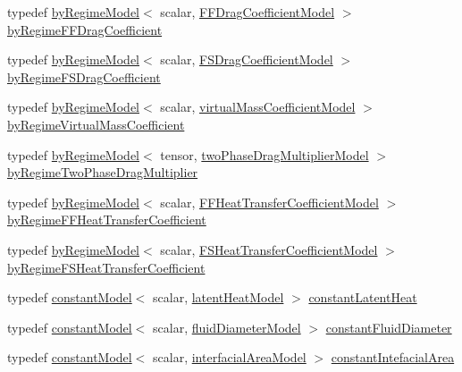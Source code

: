 \begin{DoxyCompactItemize}
\item 
typedef \hyperlink{classFoam_1_1byRegimeModel}{by\+Regime\+Model}$<$ scalar, \hyperlink{classFoam_1_1FFDragCoefficientModel}{F\+F\+Drag\+Coefficient\+Model} $>$ \hyperlink{namespaceFoam_af81bf1c46b48683cfa1a97758c9a88ee}{by\+Regime\+F\+F\+Drag\+Coefficient}
\item 
typedef \hyperlink{classFoam_1_1byRegimeModel}{by\+Regime\+Model}$<$ scalar, \hyperlink{classFoam_1_1FSDragCoefficientModel}{F\+S\+Drag\+Coefficient\+Model} $>$ \hyperlink{namespaceFoam_a05904e7dc298f47d7b89ab3e56bcf421}{by\+Regime\+F\+S\+Drag\+Coefficient}
\item 
typedef \hyperlink{classFoam_1_1byRegimeModel}{by\+Regime\+Model}$<$ scalar, \hyperlink{classFoam_1_1virtualMassCoefficientModel}{virtual\+Mass\+Coefficient\+Model} $>$ \hyperlink{namespaceFoam_a710fc9b4691ef70d9bc2552dcdd314f9}{by\+Regime\+Virtual\+Mass\+Coefficient}
\item 
typedef \hyperlink{classFoam_1_1byRegimeModel}{by\+Regime\+Model}$<$ tensor, \hyperlink{classFoam_1_1twoPhaseDragMultiplierModel}{two\+Phase\+Drag\+Multiplier\+Model} $>$ \hyperlink{namespaceFoam_a85c970e588825086eba5389c52020729}{by\+Regime\+Two\+Phase\+Drag\+Multiplier}
\item 
typedef \hyperlink{classFoam_1_1byRegimeModel}{by\+Regime\+Model}$<$ scalar, \hyperlink{classFoam_1_1FFHeatTransferCoefficientModel}{F\+F\+Heat\+Transfer\+Coefficient\+Model} $>$ \hyperlink{namespaceFoam_a931102c7c61e686c7aaecc790c34bfe5}{by\+Regime\+F\+F\+Heat\+Transfer\+Coefficient}
\item 
typedef \hyperlink{classFoam_1_1byRegimeModel}{by\+Regime\+Model}$<$ scalar, \hyperlink{classFoam_1_1FSHeatTransferCoefficientModel}{F\+S\+Heat\+Transfer\+Coefficient\+Model} $>$ \hyperlink{namespaceFoam_a58cd69873671ef15ae6cdbab25c15f74}{by\+Regime\+F\+S\+Heat\+Transfer\+Coefficient}
\item 
typedef \hyperlink{classFoam_1_1constantModel}{constant\+Model}$<$ scalar, \hyperlink{classFoam_1_1latentHeatModel}{latent\+Heat\+Model} $>$ \hyperlink{namespaceFoam_af68e9abc0c6b136c3e34c66d816fb3a1}{constant\+Latent\+Heat}
\item 
typedef \hyperlink{classFoam_1_1constantModel}{constant\+Model}$<$ scalar, \hyperlink{classFoam_1_1fluidDiameterModel}{fluid\+Diameter\+Model} $>$ \hyperlink{namespaceFoam_a9b1f75fec8c575083695f6c9e80234cf}{constant\+Fluid\+Diameter}
\item 
typedef \hyperlink{classFoam_1_1constantModel}{constant\+Model}$<$ scalar, \hyperlink{classFoam_1_1interfacialAreaModel}{interfacial\+Area\+Model} $>$ \hyperlink{namespaceFoam_a67d7b55001a14e8c5b32e3548c7cbc73}{constant\+Intefacial\+Area}

\end{DoxyCompactItemize}
